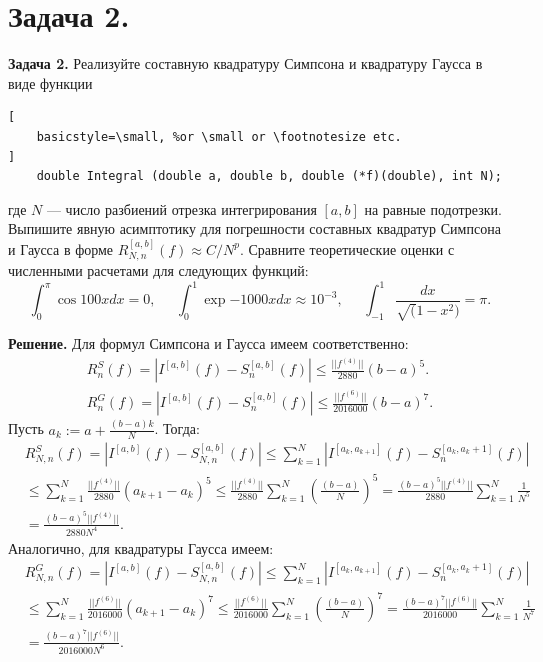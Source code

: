 \documentclass[14pt,a4paper]{extarticle}
\newcommand{\1}{\mathbbm{1}}
\begin{document}
\section{\textbf{Задача 2.}}
\textbf{Задача 2.} Реализуйте составную квадратуру Симпсона и квадратуру Гаусса в виде функции
\begin{lstlisting}[
    basicstyle=\small, %or \small or \footnotesize etc.
]
    double Integral (double a, double b, double (*f)(double), int N);

\end{lstlisting}
где $N$ — число разбиений отрезка интегрирования $[a, b]$ на равные подотрезки. Выпишите явную асимптотику
для погрешности составных квадратур Симпсона и Гаусса в форме
$R^{[a,b]}_{N, n}(f) \approx C/N^p$. Сравните теоретические оценки с численными расчетами для следующих
функций:
\begin{equation*}
    \int_{0}^{\pi} \cos{100x}dx = 0, \;\;\;\;\; \int_{0}^{1} \exp{-1000x}dx \approx 10^{-3}, \;\;\;\;\;
    \int_{-1}^{1} \frac{dx}{\sqrt(1 - x^2)} = \pi.
\end{equation*} \par

\textbf{Решение.} Для формул Симпсона и Гаусса имеем соответственно:
    \begin{align*}
        R_n^S(f) = |I^{[a,b]}(f) - S_n^{[a,b]}(f)| \leq \frac{||f^{(4)}||}{2880} (b-a)^5. \\
        R_n^G(f) = |I^{[a,b]}(f) - S_n^{[a,b]}(f)| \leq \frac{||f^{(6)}||}{2016000} (b-a)^7.
    \end{align*}
    Пусть $a_k:= a + \frac{(b-a)k}{N}$. Тогда:
    \begin{align*}
        & R_{N, n}^S(f) = |I^{[a,b]}(f) - S_{N, n}^{[a,b]}(f)| \leq \sum_{k=1}^N |I^{[a_k,a_{k+1}]}(f) - S_n^{[a_k,a_k+1]}(f)| \\
        & \leq \sum_{k=1}^N \frac{||f^{(4)}||}{2880} (a_{k+1}-a_k)^5 
        \leq \frac{||f^{(4)}||}{2880} \sum_{k=1}^N (\frac{(b-a)}{N})^5 =
        \frac{(b-a)^5||f^{(4)}||}{2880} \sum_{k=1}^N \frac{1}{N^5} \\
        & = \frac{(b-a)^5||f^{(4)}||}{2880 N^4}.
    \end{align*}
    Аналогично, для квадратуры Гаусса имеем:
    \begin{align*}
        & R_{N, n}^G(f) = |I^{[a,b]}(f) - S_{N, n}^{[a,b]}(f)| \leq \sum_{k=1}^N |I^{[a_k,a_{k+1}]}(f) - S_n^{[a_k,a_k+1]}(f)| \\
        & \leq \sum_{k=1}^N \frac{||f^{(6)}||}{2016000} (a_{k+1}-a_k)^7 
        \leq \frac{||f^{(6)}||}{2016000} \sum_{k=1}^N (\frac{(b-a)}{N})^7 =
        \frac{(b-a)^7||f^{(6)}||}{2016000} \sum_{k=1}^N \frac{1}{N^7} \\ 
        & = \frac{(b-a)^7||f^{(6)}||}{2016000 N^6}.
    \end{align*}
\end{document}
